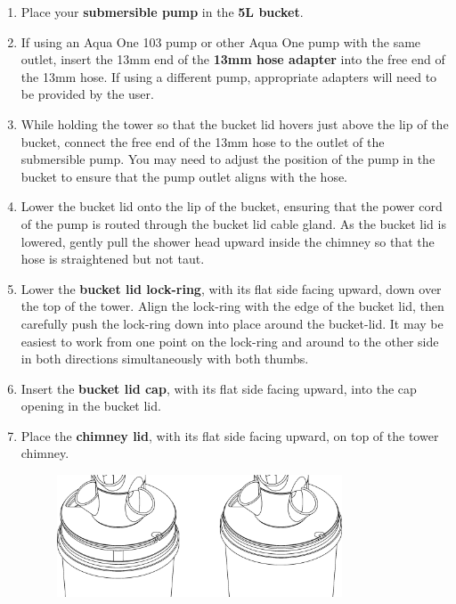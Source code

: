 \begin{enumerate}
\item Place your \textbf{submersible pump} in the \textbf{5L bucket}.

\item If using an Aqua One 103 pump or other Aqua One pump with the same outlet, insert the 13mm end of the \textbf{13mm hose adapter} into the free end of the 13mm hose. If using a different pump, appropriate adapters will need to be provided by the user.

\item While holding the tower so that the bucket lid hovers just above the lip of the bucket, connect the free end of the 13mm hose to the outlet of the submersible pump. You may need to adjust the position of the pump in the bucket to ensure that the pump outlet aligns with the hose.

\item Lower the bucket lid onto the lip of the bucket, ensuring that the power cord of the pump is routed through the bucket lid cable gland. As the bucket lid is lowered, gently pull the shower head upward inside the chimney so that the hose is straightened but not taut.

\item Lower the \textbf{bucket lid lock-ring}, with its flat side facing upward, down over the top of the tower. Align the lock-ring with the edge of the bucket lid, then carefully push the lock-ring down into place around the bucket-lid. It may be easiest to work from one point on the lock-ring and around to the other side in both directions simultaneously with both thumbs.

\item Insert the \textbf{bucket lid cap}, with its flat side facing upward, into the cap opening in the bucket lid.

\item Place the \textbf{chimney lid}, with its flat side facing upward, on top of the tower chimney.

\begin{figure}[h]
    \centering
    \vspace{-10pt}
    \includegraphics[width=0.8\textwidth]{images/50mm/50mm_assembly_8.png}
    \caption*{}
    \label{fig:50mm-eight}
\end{figure}


\end{enumerate}
